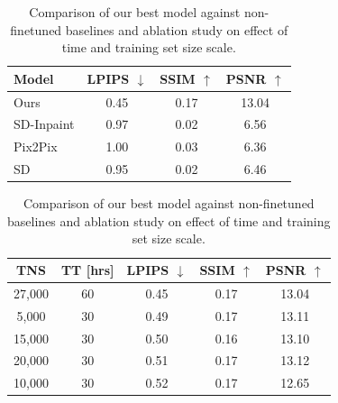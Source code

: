 \documentclass[11pt,twocolumn]{article}
\begin{document}
\begin{table}[t] %
  \centering
  \begin{subtable}[t]{0.48\textwidth} %
    \vspace{0pt} %
    \centering
    \begin{tabular}{l|ccc}
    \toprule
    \textbf{Model} & \textbf{LPIPS} $\downarrow$ & \textbf{SSIM} $\uparrow$ & \textbf{PSNR} $\uparrow$ \\
    \midrule
    Ours         & 0.45 & 0.17 & 13.04 \\
    SD-Inpaint & 0.97 & 0.02 & 6.56 \\
    Pix2Pix      & 1.00 & 0.03 & 6.36  \\
    SD  & 0.95 & 0.02 & 6.46 \\
    \bottomrule
    \end{tabular}
    \label{tab:best-vs-baseline}
  \end{subtable}
  \hfill
  \begin{subtable}[t]{0.48\textwidth} %
    \vspace{0pt} %
    \centering
    \begin{tabular}{cc|ccc}
    \toprule
    \textbf{TNS} & \textbf{TT [hrs]} & \textbf{LPIPS} $\downarrow$ & \textbf{SSIM} $\uparrow$ & \textbf{PSNR} $\uparrow$ \\
    \midrule
    27,000 & 60 & 0.45 & 0.17 & 13.04 \\
    5,000 & 30 & 0.49 & 0.17 & 13.11 \\
    15,000 & 30 & 0.50 & 0.16 & 13.10 \\
    20,000 & 30 & 0.51 & 0.17 & 13.12 \\
    10,000 & 30 & 0.52 & 0.17 & 12.65 \\
    \bottomrule
    \end{tabular}
    \label{tab:scale-study}
  \end{subtable}
  \caption{Comparison of our best model against non-finetuned baselines and ablation study on effect of time and training set size scale.}
  \label{tab:base-and-scale}
\end{table}
\end{document}
